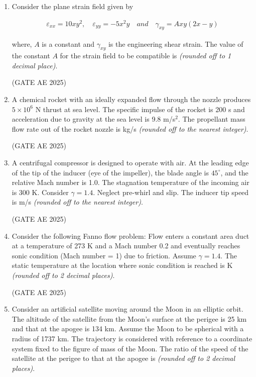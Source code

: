 \documentclass[journal,12pt,onecolumn]{IEEEtran}
\theoremstyle{remark}
\begin{document}
\begin{flushleft}
\begin{enumerate}
\item Consider the plane strain field given by  

\begin{align*}
    \varepsilon_{xx} = 10xy^2, \quad \varepsilon_{yy} = -5x^2y \quad and \quad \gamma_{xy} = Axy(2x-y)
\end{align*}

where, $A$ is a constant and $\gamma_{xy}$ is the engineering shear strain. The value of the constant $A$ for the strain field to be compatible is \underline{\hspace{3cm}} \textit{(rounded off to 1 decimal place)}.

\hfill (GATE AE 2025)

\item A chemical rocket with an ideally expanded flow through the nozzle produces $5\times 10^6$ N thrust at sea level. The specific impulse of the rocket is 200 s and acceleration due to gravity at the sea level is 9.8 m/s$^2$. The propellant mass flow rate out of the rocket nozzle is \underline{\hspace{3cm}} kg/s \textit{(rounded off to the nearest integer)}.

\hfill (GATE AE 2025)

\item A centrifugal compressor is designed to operate with air. At the leading edge of the tip of the inducer (eye of the impeller), the blade angle is $45^\circ$, and the relative Mach number is 1.0. The stagnation temperature of the incoming air is 300 K. Consider $\gamma = 1.4$. Neglect pre-whirl and slip. The inducer tip speed is \underline{\hspace{3cm}} m/s \textit{(rounded off to the nearest integer)}.

\hfill (GATE AE 2025)

\item Consider the following Fanno flow problem: Flow enters a constant area duct at a temperature of 273 K and a Mach number 0.2 and eventually reaches sonic condition (Mach number = 1) due to friction. Assume $\gamma = 1.4$. The static temperature at the location where sonic condition is reached is \underline{\hspace{3cm}} K \textit{(rounded off to 2 decimal places)}.

\hfill (GATE AE 2025)

\item Consider an artificial satellite moving around the Moon in an elliptic orbit. The altitude of the satellite from the Moon's surface at the perigee is 25 km and that at the apogee is 134 km. Assume the Moon to be spherical with a radius of 1737 km. The trajectory is considered with reference to a coordinate system fixed to the figure of mass of the Moon. The ratio of the speed of the satellite at the perigee to that at the apogee is \underline{\hspace{3cm}} \textit{(rounded off to 2 decimal places)}.


\end{enumerate}
\end{flushleft}
\end{document}

